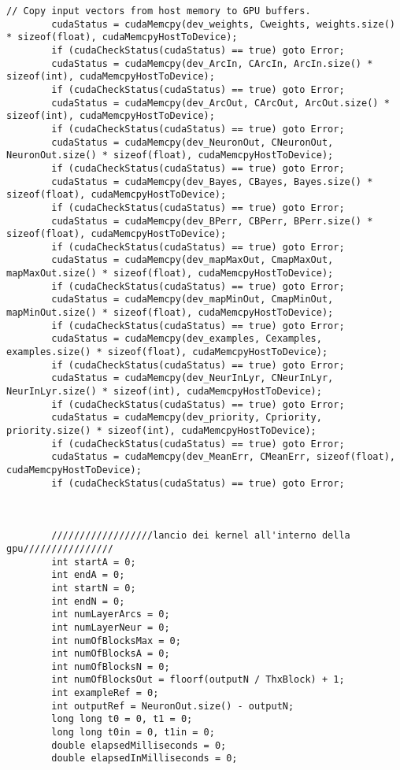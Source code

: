 \documentclass[10pt,a4paper]{article}
\begin{document}
\begin{lstlisting}[style=mycuda, caption= classe di interfaccia alla GPU, captionpos=b]
		// Copy input vectors from host memory to GPU buffers.
		cudaStatus = cudaMemcpy(dev_weights, Cweights, weights.size() * sizeof(float), cudaMemcpyHostToDevice);
		if (cudaCheckStatus(cudaStatus) == true) goto Error;
		cudaStatus = cudaMemcpy(dev_ArcIn, CArcIn, ArcIn.size() * sizeof(int), cudaMemcpyHostToDevice);
		if (cudaCheckStatus(cudaStatus) == true) goto Error;
		cudaStatus = cudaMemcpy(dev_ArcOut, CArcOut, ArcOut.size() * sizeof(int), cudaMemcpyHostToDevice);
		if (cudaCheckStatus(cudaStatus) == true) goto Error;
		cudaStatus = cudaMemcpy(dev_NeuronOut, CNeuronOut, NeuronOut.size() * sizeof(float), cudaMemcpyHostToDevice);
		if (cudaCheckStatus(cudaStatus) == true) goto Error;
		cudaStatus = cudaMemcpy(dev_Bayes, CBayes, Bayes.size() * sizeof(float), cudaMemcpyHostToDevice);
		if (cudaCheckStatus(cudaStatus) == true) goto Error;
		cudaStatus = cudaMemcpy(dev_BPerr, CBPerr, BPerr.size() * sizeof(float), cudaMemcpyHostToDevice);
		if (cudaCheckStatus(cudaStatus) == true) goto Error;
		cudaStatus = cudaMemcpy(dev_mapMaxOut, CmapMaxOut, mapMaxOut.size() * sizeof(float), cudaMemcpyHostToDevice);
		if (cudaCheckStatus(cudaStatus) == true) goto Error;
		cudaStatus = cudaMemcpy(dev_mapMinOut, CmapMinOut, mapMinOut.size() * sizeof(float), cudaMemcpyHostToDevice);
		if (cudaCheckStatus(cudaStatus) == true) goto Error;
		cudaStatus = cudaMemcpy(dev_examples, Cexamples, examples.size() * sizeof(float), cudaMemcpyHostToDevice);
		if (cudaCheckStatus(cudaStatus) == true) goto Error;
		cudaStatus = cudaMemcpy(dev_NeurInLyr, CNeurInLyr, NeurInLyr.size() * sizeof(int), cudaMemcpyHostToDevice);
		if (cudaCheckStatus(cudaStatus) == true) goto Error;
		cudaStatus = cudaMemcpy(dev_priority, Cpriority, priority.size() * sizeof(int), cudaMemcpyHostToDevice);
		if (cudaCheckStatus(cudaStatus) == true) goto Error;
		cudaStatus = cudaMemcpy(dev_MeanErr, CMeanErr, sizeof(float), cudaMemcpyHostToDevice);
		if (cudaCheckStatus(cudaStatus) == true) goto Error;



		//////////////////lancio dei kernel all'interno della gpu////////////////
		int startA = 0;
		int endA = 0;
		int startN = 0;
		int endN = 0;
		int numLayerArcs = 0;
		int numLayerNeur = 0;
		int numOfBlocksMax = 0;
		int numOfBlocksA = 0;
		int numOfBlocksN = 0;
		int numOfBlocksOut = floorf(outputN / ThxBlock) + 1;
		int exampleRef = 0;
		int outputRef = NeuronOut.size() - outputN;
		long long t0 = 0, t1 = 0;
		long long t0in = 0, t1in = 0;
		double elapsedMilliseconds = 0;
		double elapsedInMilliseconds = 0;


\end{lstlisting}
\end{document}
